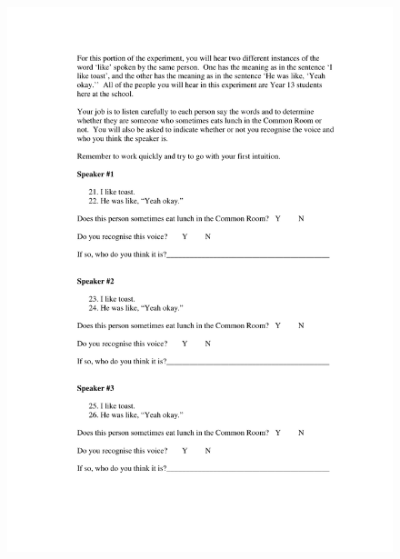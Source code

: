 \begin{figure}
	\centering
		\includegraphics[width=5in]{images/Exp3page5.pdf}
		\label{x3p5}
\end{figure}

